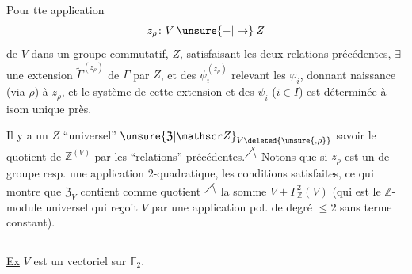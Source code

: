 Pour tte application
\[
z_{\rho}\colon V\mathbin{\unsure{-|\to}}Z
\]
de $V$ dans un groupe commutatif, $Z$,
satisfaisant les deux relations précédentes,
$\exists$ une extension $\widetilde{\Gamma}^{(z_\rho)}$ de $\Gamma$ par $Z$,
et des $\psi_i^{(z_\rho)}$ relevant les $\varphi_i$, donnant
naissance (via $\rho$) à $z_\rho$, et
le système de cette extension et
des $\psi_i$ ($i\in I$) est déterminée à isom
unique près.

Il y a un $Z$ ``universel'' $\unsure{\mathfrak Z|\mathscr Z}_{V\deleted{\unsure{,\rho}}}$
savoir le quotient de $\mathbb Z^{(V)}$ par
les ``relations'' précédentes.\textsuperscript{\ensuremath{\diagup\mkern-6mu\backslash}}
Notons que si $z_\rho$ est  un  de groupe
resp. une application $2$-quadratique, les
conditions  satisfaites, ce qui
montre que $\mathfrak Z_V$ contient comme
 quotient \textsuperscript{\ensuremath{\diagup\mkern-6mu\backslash}}
la somme $V+\Gamma^2_{\mathbb Z}(V)$
(qui est le $\mathbb Z$-module universel qui
reçoit $V$ par une application pol. de
degré $\leq2$ sans terme constant).

\begin{center}\rule{1.3cm}{0.35pt}\end{center}

\uline{Ex} $V$ est un vectoriel  sur $\mathbb F_2$.

